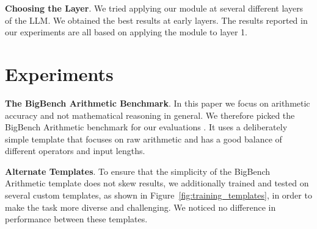 \documentclass[11pt]{article}
\begin{document}
\textbf{Choosing the Layer}.
We tried applying our module at several different layers of the LLM.
We obtained the best results at early layers.
The results reported in our experiments are all based on applying the module to layer 1.






\section{Experiments}
\label{section-experiments}



\textbf{The BigBench Arithmetic Benchmark}.
In this paper we focus on arithmetic accuracy and not mathematical reasoning in general.
We therefore picked the BigBench Arithmetic benchmark for our evaluations \citep{srivastava2023beyond}.
It uses a deliberately simple template that focuses on raw arithmetic and has a good balance of different operators and input lengths.


\textbf{Alternate Templates}.
To ensure that the simplicity of the BigBench Arithmetic template does not skew results, we additionally trained and tested on several custom templates, as shown in Figure~\ref{fig:training_templates}, in order to make the task more diverse and challenging. We noticed no difference in performance between these templates.

\end{document}
